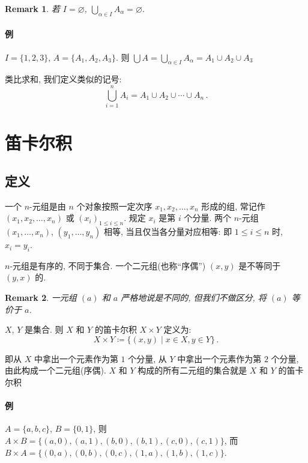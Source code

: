 \documentclass[UTF8]{ctexart}
\theoremstyle{mystyle}
\theoremstyle{myremark}
\newtheorem*{remark}{Remark}
\theoremstyle{plain}
\newcommand{\set}[1]{\{#1\}}
\begin{document}
\begin{remark}
    若 $ I = \varnothing $, $ \displaystyle \bigcup_{\alpha \in I} A_\alpha = \varnothing $.
\end{remark}

\paragraph{例}
$ I = \set{1, 2, 3} $, $ A = \set{A_1, A_2, A_3} $. 则 $ \bigcup A = \bigcup_{\alpha \in I} A_\alpha = A_1 \cup A_2 \cup A_3 $

类比求和, 我们定义类似的记号: \[ \bigcup_{i = 1}^n A_i = A_1 \cup A_2 \cup \cdots \cup A_n \,.\]

\section{笛卡尔积}
\subsection{定义}
\begin{definition}[\text{$ n $-元组}]
    一个 $ n $-元组是由 $ n $ 个对象按照一定次序 $ x_1, x_2, \dots, x_n $ 形成的组, 常记作 $ (x_1, x_2, \dots, x_n) $ 或 $ (x_i)_{1 \leqslant i \leqslant n} $. 规定 $ x_i $ 是第 $ i $ 个分量. 两个 $ n $-元组 $ (x_1, \dots, x_n) $, $ (y_1, \dots, y_n) $ 相等, 当且仅当各分量对应相等: 即 $ 1 \leqslant i \leqslant n $ 时, $ x_i = y_i $.
\end{definition}

$ n $-元组是有序的, 不同于集合. 一个二元组(也称``序偶'') $ (x, y) $ 是不等同于 $ (y, x) $ 的.

\begin{remark}
    一元组 $ (a) $ 和 $ a $ 严格地说是不同的, 但我们不做区分, 将 $ (a) $ 等价于 $ a $.
\end{remark}

\begin{definition}
    $ X $, $ Y $ 是集合. 则 $ X $ 和 $ Y $ 的笛卡尔积 $ X \times Y $ 定义为: \[ X \times Y \coloneqq \set{(x, y) \mid x \in X, y \in Y} \,.\]
\end{definition}

即从 $ X $ 中拿出一个元素作为第 $ 1 $ 个分量, 从 $ Y $ 中拿出一个元素作为第 $ 2 $ 个分量, 由此构成一个二元组(序偶). $ X $ 和 $ Y $ 构成的所有二元组的集合就是 $ X $ 和 $ Y $ 的笛卡尔积

\paragraph{例}
$ A = \set{a, b, c} $, $ B = \set{0, 1} $, 则 $ A \times B = \set{(a, 0), (a, 1), (b, 0), (b, 1), (c, 0), (c, 1)} $, 而 $ B \times A = \set{(0, a), (0, b), (0, c), (1, a), (1, b), (1, c)} $.
\end{document}
